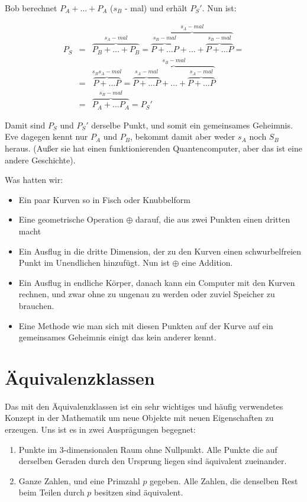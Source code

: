 \documentclass{article}
\begin{document}
Bob berechnet $P_A + \ldots + P_A$ ($s_B$ - mal) und erhält $P_S'$. Nun ist:

\begin{eqnarray*}
  P_S &=& \overbrace{P_B + \ldots + P_B}^{s_A-mal} =
  \overbrace{\overbrace{P + \ldots P}^{s_B-mal} + \ldots +
  \overbrace{P + \ldots P}^{s_B-mal}}^{s_A-mal} = \\
  &=& \overbrace{P + \ldots P}^{s_Bs_A-mal} =
  \overbrace{\overbrace{P + \ldots P}^{s_A-mal} + \ldots +
  \overbrace{P + \ldots P}^{s_A-mal}}^{s_B-mal} \\
  &=& \overbrace{P_A + \ldots P_A}^{s_B-mal} = P_S'
\end{eqnarray*}

Damit sind $P_S$ und $P_S'$ derselbe Punkt, und somit ein gemeinsames
Geheimnis. Eve dagegen kennt nur $P_A$ und $P_B$, bekommt damit aber weder
$s_A$ noch $S_B$ heraus. (Außer sie hat einen funktionierenden
Quantencomputer, aber das ist eine andere Geschichte).

Was hatten wir:

\begin{itemize}
\item Ein paar Kurven so in Fisch oder Knubbelform
\item Eine geometrische Operation $\oplus$ darauf, die aus zwei Punkten einen
  dritten macht
\item Ein Ausflug in die dritte Dimension, der zu den Kurven einen
  schwurbelfreien Punkt im Unendlichen hinzufügt. Nun ist $\oplus$ eine
  Addition.
\item Ein Ausflug in endliche Körper, danach kann ein Computer mit den
  Kurven rechnen, und zwar ohne zu ungenau zu werden oder zuviel
  Speicher zu brauchen.
\item Eine Methode wie man sich mit diesen Punkten auf der Kurve auf ein
  gemeinsames Geheimnis einigt das kein anderer kennt.
\end{itemize}

\section{Äquivalenzklassen}
Das mit den Äquivalenzklassen ist ein sehr wichtiges und häufig verwendetes
Konzept in der Mathematik um neue Objekte mit neuen Eigenschaften zu
erzeugen. Uns ist es in zwei Ausprägungen begegnet:

\begin{enumerate}
\item Punkte im 3-dimensionalen Raum ohne Nullpunkt. Alle Punkte die auf derselben
   Geraden durch den Ursprung liegen sind äquivalent zueinander.
\item Ganze Zahlen, und eine Primzahl $p$ gegeben. Alle Zahlen, die denselben Rest
   beim Teilen durch $p$ besitzen sind äquivalent.
\end{enumerate}
\end{document}
